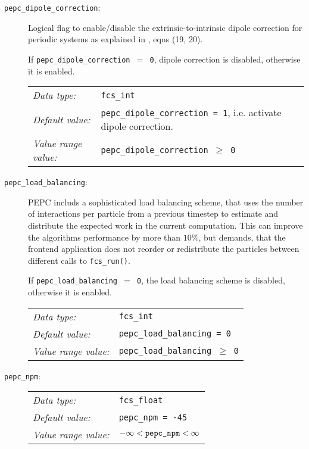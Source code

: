 \begin{description}
  \item[\texttt{pepc\_dipole\_correction}:] Logical flag to enable/disable the extrinsic-to-intrinsic
	dipole correction for periodic systems as explained in , eqns (19, 20).

	If \texttt{pepc\_dipole\_correction $=$ 0}, dipole correction is disabled, otherwise it is enabled.

	\begin{tabular}{ll}
	   \textit{Data type:}         & \texttt{fcs\_int} \\
	   \textit{Default value:}     & \texttt{pepc\_dipole\_correction = 1}, i.e. activate dipole correction.\\
	   \textit{Value range value:} & \texttt{pepc\_dipole\_correction $\geq$ 0}
	\end{tabular}

  \item[\texttt{pepc\_load\_balancing}:] PEPC includs a sophisticated load balancing scheme, that uses
	the number of interactions per particle from a previous timestep to estimate and distribute the
	expected work in the current computation. This can improve the algorithms performance by more than $10\%$,
	but demands, that the frontend application does not reorder or redistribute the particles between 
	different calls to \texttt{fcs\_run()}.

	If \texttt{pepc\_load\_balancing $=$ 0}, the load balancing scheme is disabled, otherwise it is enabled.

	\begin{tabular}{ll}
	   \textit{Data type:}         & \texttt{fcs\_int} \\
	   \textit{Default value:}     & \texttt{pepc\_load\_balancing = 0} \\
	   \textit{Value range value:} & \texttt{pepc\_load\_balancing $\geq$ 0}
	\end{tabular}

  \item[\texttt{pepc\_npm}:] 

	\begin{tabular}{ll}
	   \textit{Data type:}         & \texttt{fcs\_float} \\
	   \textit{Default value:}     & \texttt{pepc\_npm = -45} \\
	   \textit{Value range value:} & \texttt{$-\infty < \text{\texttt{pepc\_npm}} < \infty$}
	\end{tabular}
\end{description}


